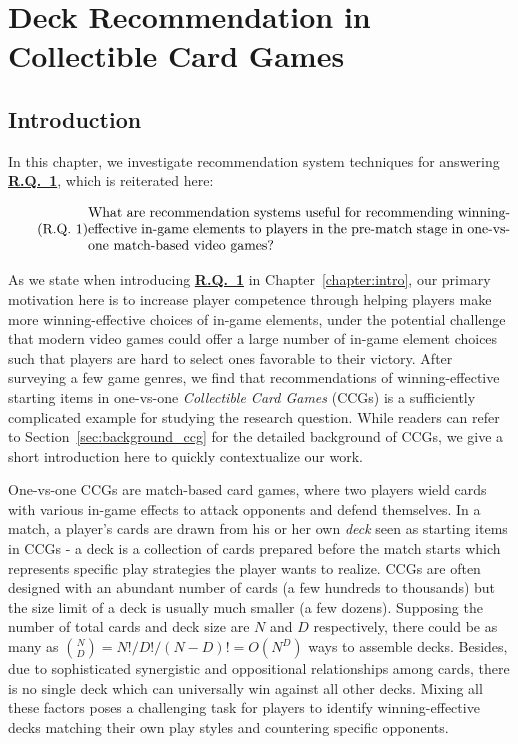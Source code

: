 \chapter{Deck Recommendation in Collectible Card Games} 

\label{chapter:qdeckrec} 


\section{Introduction}\label{sec:introduction}

In this chapter, we investigate recommendation system techniques for answering \hyperref[rq1]{\textbf{R.Q.~1}}, which is reiterated here:

\begin{equation}
  \tag{R.Q. 1}\label{chapter3_rq1}
  \parbox{\dimexpr\linewidth-4em}{%
    \strut
    What are recommendation systems useful for recommending winning-effective in-game elements to players in the pre-match stage in one-vs-one match-based video games?
    \strut
  }
\end{equation}

As we state when introducing \hyperref[rq1]{\textbf{R.Q.~1}} in Chapter~\ref{chapter:intro}, our primary motivation here is to increase player competence through helping players make more winning-effective choices of in-game elements, under the potential challenge that modern video games could offer a large number of in-game element choices such that players are hard to select ones favorable to their victory. After surveying a few game genres, we find that recommendations of winning-effective starting items in  one-vs-one \textit{Collectible Card Games} (CCGs) is a sufficiently complicated example for studying the research question. While readers can refer to Section~\ref{sec:background_ccg} for the detailed background of CCGs, we give a short introduction here to quickly contextualize our work. 

One-vs-one CCGs are match-based card games, where two players wield cards with various in-game effects to attack opponents and defend themselves. In a match, a player's cards are drawn from his or her own \textit{deck} seen as starting items in CCGs - a deck is a collection of cards prepared before the match starts which represents specific play strategies the player wants to realize. CCGs are often designed with an abundant number of cards (a few hundreds to thousands) but the size limit of a deck is usually much smaller (a few dozens). Supposing the number of total cards and deck size are $N$ and $D$ respectively, there could be as many as ${N\choose D}=N!/D!/(N-D)!=O(N^D)$ ways to assemble decks. Besides, due to sophisticated synergistic and oppositional relationships among cards, there is no single deck which can universally win against all other decks. Mixing all these factors poses a challenging task for players to identify winning-effective decks matching their own play styles and countering specific opponents.


